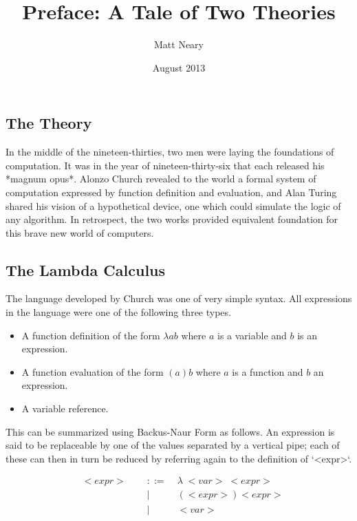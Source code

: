 \documentclass[11pt]{article}
\begin{document}
\begin{titlepage}
\title{Preface: A Tale of Two Theories}
\author{Matt Neary}
\date{August 2013}
\maketitle
\thispagestyle{empty}
\end{titlepage}
\subsection{The Theory}
In the middle of the nineteen-thirties, two men were laying the foundations of computation. It was in the year of nineteen-thirty-six that each released his *magnum opus*. Alonzo Church revealed to the world a formal system of computation expressed by function definition and evaluation, and Alan Turing shared his vision of a hypothetical device, one which could simulate the logic of any algorithm. In retrospect, the two works provided equivalent foundation for this brave new world of computers.

\subsection{The Lambda Calculus}
The language developed by Church was one of very simple syntax. All expressions in the language were one of the following three types.

\begin{itemize}
  \item A function definition of the form $\lambda a b$ where $a$ is a variable and $b$ is an expression.
  \item A function evaluation of the form $(a)b$ where $a$ is a function and $b$ an expression.
  \item A variable reference.
\end{itemize}

This can be summarized using Backus-Naur Form as follows. An expression is said to be replaceable by one of the values separated by a vertical pipe; each of these can then in turn be reduced by referring again to the definition of `<expr>`.

\begin{align*}
& <expr> \; &::= \; &\lambda \; <var> \; <expr>
\\& \qquad \qquad \qquad &| \; &(<expr>)<expr>
\\& \qquad \qquad \qquad &| \; &<var>
\end{align*}
\end{document}
